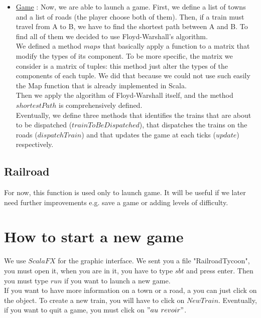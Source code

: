\documentclass[a4paper]{article}
\begin{document}
\begin{itemize}
		\item \underline{Game} : Now, we are able to launch a game. First, we define a list of towns and a list of roads (the player choose both of them). Then, if a train must travel from A to B, we have to find the shortest path between A and B. To find all of them we decided to use Floyd-Warshall's algorithm. \\
		We defined a method $maps$ that basically apply a function to a matrix that modify the types of its component. To be more specific, the matrix we consider is a matrix of tuples: this method just alter the types of the components of each tuple. We did that because we could not use such easily the Map function that is already implemented in Scala. \\
		Then we apply the algorithm of Floyd-Warshall itself, and the method $shortestPath$ is comprehensively defined.\\
		Eventually, we define three methods that identifies the trains that are about to be dispatched ($trainToBeDispatched$), that dispatches the trains on the roads ($dispatchTrain$) and that updates the game at each ticks ($update$) respectively.




	\end{itemize}
	\subsection{Railroad}
	For now, this function is used only to launch game. It will be useful if we later need further improvements e.g. save a game or adding levels of difficulty.
	\section{How to start a new game}

	We use $ScalaFX$ for the graphic interface. We sent you a file "RailroadTycoon", you must open it, when you are in it, you have to type $sbt$ and press enter. Then you must type $run$ if you want to launch a new game.\\
	If you want to have more information on a town or a road, a you can just click on the object.
	To create a new train, you will have to click on $New Train$. Eventually, if you want to quit a game, you must click on $"au$ $revoir"$.
\end{document}
